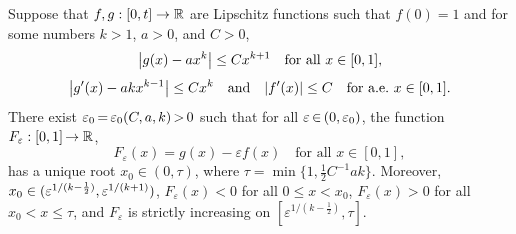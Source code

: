 \documentclass[AHL,Unicode,longabstracts,published]{cedram}
\newcommand{\R}{\mathbb{R}}
\renewcommand{\epsilon}{\varepsilon}
\newcommand*{\Mk}{\mkern -2mu}
\renewcommand*{\to}{\mathchoice{\longrightarrow}{\rightarrow}{\rightarrow}{\rightarrow}}
\let\originalleft\left
\let\originalright\right
\renewcommand{\left}{\mathopen{}\mathclose\bgroup\originalleft}
\renewcommand{\right}{\aftergroup\egroup\originalright}
\newcommand{\R}{\mathbb{R}}
\begin{document}
\begin{lemm}\label{lem:z_pert_1}
Suppose that $f,g:[0,t]\to\R$ are Lipschitz functions such that $f(0)=1$ and for some numbers $k>1$, $a>0$, and $C>0$,
\begin{equation}
\left|g(x)-a x^k\right|\leq C x^{k+1}\quad\text{for all $x\in[0,1]$,}
\end{equation}
\begin{equation}
\left|g'(x)-ak x^{k-1}\right|\leq C x^{k}\quad\text{and}\quad \left|f'(x)\right|\leq C\quad\text{for a.e.~$x\in[0,1]$.}
\end{equation}
There exist $\epsilon_0\Mk=\Mk\epsilon_0(C,a,k)\Mk>\Mk0$ such that for all $\epsilon\Mk \in\Mk (0, \epsilon_0)$, the function ${F_\epsilon:[0,1]\Mk\to\R}$,
\begin{equation}
F_\epsilon(x) = g(x) - \epsilon f(x)\quad\text{for all $x\in[0,1]$},
\end{equation}
has a unique root $x_0\in(0,\tau)$, where $\tau=\min\{1,\frac{1}{2}C^{-1}ak\}$. Moreover, $x_0\in (\epsilon^{1/(k-\frac12)},\linebreak\epsilon^{1/(k+1)})$, $F_\epsilon(x)<0$ for all $0\leq x<x_0$, $F_\epsilon(x)>0$ for all $x_0<x\leq \tau$, and $F_\epsilon$ is strictly increasing on $[\epsilon^{1/(k-\frac12)},\tau]$.
\end{lemm}
\end{document}
